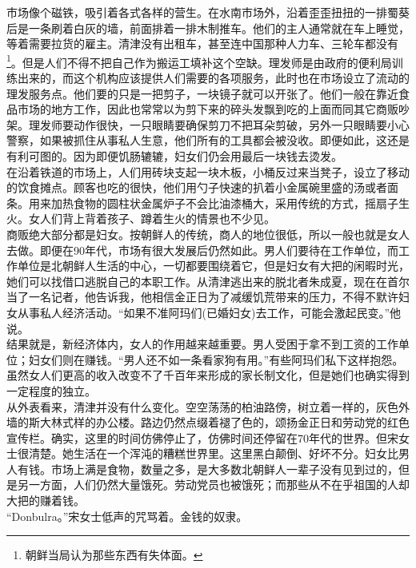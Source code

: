 市场像个磁铁，吸引着各式各样的营生。在水南市场外，沿着歪歪扭扭的一排蜀葵后是一条刷着白灰的墙，前面排着一排木制推车。他们的主人通常就在车上睡觉，等着需要拉货的雇主。清津没有出租车，甚至连中国那种人力车、三轮车都没有\footnote{朝鲜当局认为那些东西有失体面。}。但是人们不得不把自己作为搬运工填补这个空缺。理发师是由政府的便利局训练出来的，而这个机构应该提供人们需要的各项服务，此时也在市场设立了流动的理发服务点。他们要的只是一把剪子，一块镜子就可以开张了。他们一般在靠近食品市场的地方工作，因此也常常以为剪下来的碎头发飘到吃的上面而同其它商贩吵架。理发师要动作很快，一只眼睛要确保剪刀不把耳朵剪破，另外一只眼睛要小心警察，如果被抓住从事私人生意，他们所有的工具都会被没收。即便如此，这还是有利可图的。因为即便饥肠辘辘，妇女们仍会用最后一块钱去烫发。\\

在沿着铁道的市场上，人们用砖块支起一块木板，小桶反过来当凳子，设立了移动的饮食摊点。顾客也吃的很快，他们用勺子快速的扒着小金属碗里盛的汤或者面条。用来加热食物的圆柱状金属炉子不会比油漆桶大，采用传统的方式，摇扇子生火。女人们背上背着孩子、蹲着生火的情景也不少见。\\

商贩绝大部分都是妇女。按朝鲜人的传统，商人的地位很低，所以一般也就是女人去做。即便在90年代，市场有很大发展后仍然如此。男人们要待在工作单位，而工作单位是北朝鲜人生活的中心，一切都要围绕着它，但是妇女有大把的闲暇时光，她们可以找借口逃脱自己的本职工作。从清津逃出来的脱北者朱成夏，现在在首尔当了一名记者，他告诉我，他相信金正日为了减缓饥荒带来的压力，不得不默许妇女从事私人经济活动。“如果不准阿玛们(已婚妇女)去工作，可能会激起民变。”他说。\\

结果就是，新经济体内，女人的作用越来越重要。男人受困于拿不到工资的工作单位；妇女们则在赚钱。“男人还不如一条看家狗有用。”有些阿玛们私下这样抱怨。虽然女人们更高的收入改变不了千百年来形成的家长制文化，但是她们也确实得到一定程度的独立。\\

从外表看来，清津并没有什么变化。空空荡荡的柏油路傍，树立着一样的，灰色外墙的斯大林式样的办公楼。路边仍然点缀着褪了色的，颂扬金正日和劳动党的红色宣传栏。确实，这里的时间仿佛停止了，仿佛时间还停留在70年代的世界。但宋女士很清楚。她生活在一个浑沌的糟糕世界里。这里黑白颠倒、好坏不分。妇女比男人有钱。市场上满是食物，数量之多，是大多数北朝鲜人一辈子没有见到过的，但是另一方面，人们仍然大量饿死。劳动党员也被饿死；而那些从不在乎祖国的人却大把的赚着钱。\\

“Donbulra。”宋女士低声的咒骂着。金钱的奴隶。\\

